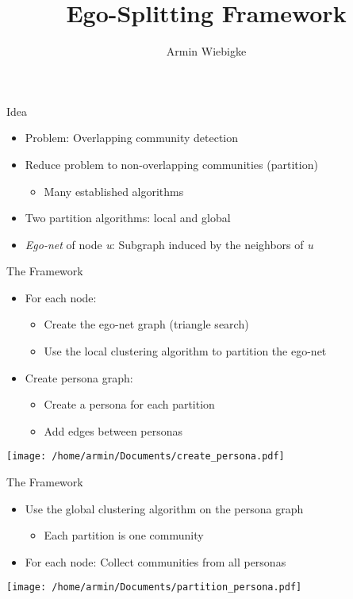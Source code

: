 \documentclass[11pt]{beamer}
\begin{document}
	\author{Armin Wiebigke}
	\title{Ego-Splitting Framework}
	\begin{frame}[plain]
	\maketitle
\end{frame}

\begin{frame}{Idea}
\begin{itemize}
	\item Problem: Overlapping community detection
	\item Reduce problem to non-overlapping communities (partition)
	\begin{itemize}
		\item Many established algorithms
	\end{itemize}
	\item Two partition algorithms: local and global
	\item \emph{Ego-net} of node \textit{u}: Subgraph induced by the neighbors of \textit{u}
\end{itemize}
\end{frame}


\begin{frame}{The Framework}
\begin{itemize}
	 \item For each node:
	 \begin{itemize}
	 	\item Create the ego-net graph (triangle search)
	 	\item Use the local clustering algorithm to partition the ego-net
	 \end{itemize}
	 \item Create persona graph:
	 \begin{itemize}
	 	\item Create a persona for each partition
	 	\item Add edges between personas
	 \end{itemize}
\end{itemize}
\vfill
\centering
\texttt{[image: /home/armin/Documents/create\_persona.pdf]}
\end{frame}

\begin{frame}{The Framework}
	
\begin{itemize}	
	\item Use the global clustering algorithm on the persona graph
	\begin{itemize}
		\item Each partition is one community
	\end{itemize}
	\item For each node: Collect communities from all personas
	\end{itemize}
	\vfill
	\centering
	\texttt{[image: /home/armin/Documents/partition\_persona.pdf]}
\end{frame}
\end{document}
